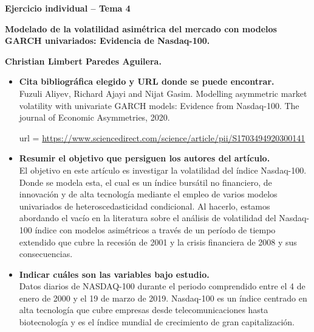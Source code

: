 \begin{center}
\textbf{Ejercicio individual – Tema 4}
\end{center}

\begin{center}
\textbf{Modelado de la volatilidad asimétrica del mercado con modelos GARCH univariados: Evidencia de Nasdaq-100.}
\end{center}
\vspace{0.3cm}

\begin{center}
    \textbf{Christian Limbert Paredes Aguilera.}
\end{center}

\vspace{0.5cm}

\begin{itemize}

    \item \textbf{Cita bibliográfica elegido y URL donde se puede encontrar.}\\

	Fuzuli Aliyev, Richard Ajayi and Nijat Gasim. Modelling asymmetric market volatility with univariate GARCH models: Evidence from Nasdaq-100. The journal of Economic Asymmetries, 2020.

	url = \url{https://www.sciencedirect.com/science/article/pii/S1703494920300141}\\

    \item \textbf{Resumir el objetivo que persiguen los autores del artículo.}\\

	El objetivo en este artículo es investigar la volatilidad del índice Nasdaq-100. Donde se modela esta, el cual es un índice bursátil no financiero, de innovación y de alta tecnología mediante el empleo de varios modelos univariados de heteroscedasticidad condicional. 
	 Al hacerlo, estamos abordando el vacío en la literatura sobre el análisis de volatilidad del Nasdaq-100 índice con modelos asimétricos a través de un período de tiempo extendido que cubre la recesión de 2001 y la crisis financiera de 2008 y sus consecuencias. \\

    \item \textbf{Indicar cuáles son las variables bajo estudio.}\\

	Datos diarios de NASDAQ-100 durante el periodo comprendido entre el 4 de enero de 2000 y el 19 de marzo de 2019.
	Nasdaq-100 es un índice centrado en alta tecnología que cubre empresas desde telecomunicaciones hasta biotecnología y es el índice mundial de crecimiento de gran capitalización.\\


\end{itemize}
